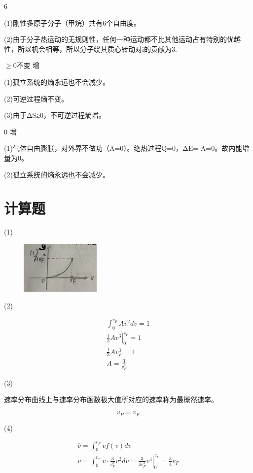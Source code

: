 \documentclass[b5paper,opensource]{./template/qyxf-book}
\begin{document}
6

\solve (1)刚性多原子分子（甲烷）共有6个自由度。

(2)由于分子热运动的无规则性，任何一种运动都不比其他运动占有特别的优越性，所以机会相等，所以分子绕其质心转动对i的贡献为3.

$
\geqslant 0 
$\qquad 不变 \qquad 增

\solve
(1)孤立系统的熵永远也不会减少。

(2)可逆过程熵不变。

(3)由于ΔS≥0，不可逆过程熵增。


0 \qquad 增

\solve(1)气体自由膨胀，对外界不做功（A=0）。绝热过程Q=0，ΔE=-A=0。故内能增量为0。

(2)孤立系统的熵永远也不会减少。


\section{计算题}

\solve
(1)
\begin{figure}[!ht]
	\centering
	\includegraphics[width=0.35\textwidth]{2_21.jpg}
\end{figure}
\newpage
(2)

$$
\begin{array} { c } { \int _ { 0 } ^ { v _ { F } } A v ^ { 2 } d v = 1 } \\ { \left. \frac { 1 } { 3 } A v ^ { 3 } \right| _ { 0 } ^ { v _ { F } } = 1 } \\ { \frac { 1 } { 3 } A v _ { F } ^ { 3 } = 1 } \\ { A = \frac { 3 } { v _ { F } ^ { 3 } } } \end{array}
$$

(3)

速率分布曲线上与速率分布函数极大值所对应的速率称为最概然速率。

$$ v_P=v_F $$

(4)

$$
\begin{array} { c } { \bar { v } = \int _ { 0 } ^ { v _ { F } } v f ( v ) d v } \\ { \bar { v } = \int _ { 0 } ^ { v _ { F } } v \cdot \frac { 3 } { v _ { F } ^ { 3 } } v ^ { 2 } d v = \left. \frac { 3 } { 4 v _ { F } ^ { 3 } } v ^ { 4 } \right| _ { 0 } ^ { v _ { F } } = \frac { 3 } { 4 } v _ { F } } \end{array}
$$
\end{document}
